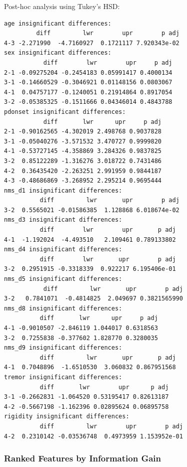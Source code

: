 \documentclass[letterpaper,12pt]{article}
\begin{document}
Post-hoc analysis using Tukey's HSD:
\begin{verbatim}
age insignificant differences:
         diff         lwr        upr        p adj
4-3 -2.271990  -4.7160927  0.1721117 7.920343e-02
sex insignificant differences:
           diff        lwr        upr     p adj
2-1 -0.09275204 -0.2454183 0.05991417 0.4000134
3-1 -0.14660529 -0.3046921 0.01148156 0.0803067
4-1  0.04757177 -0.1240051 0.21914864 0.8917054
3-2 -0.05385325 -0.1511666 0.04346014 0.4843788
pdonset insignificant differences:
           diff       lwr      upr     p adj
2-1 -0.90162565 -4.302019 2.498768 0.9037828
3-1 -0.05040276 -3.571532 3.470727 0.9999820
4-1 -0.53727145 -4.358869 3.284326 0.9837825
3-2  0.85122289 -1.316276 3.018722 0.7431486
4-2  0.36435420 -2.263251 2.991959 0.9844187
4-3 -0.48686869 -3.268952 2.295214 0.9695444
nms_d1 insignificant differences:
          diff         lwr       upr        p adj
3-2  0.5565021 -0.01586385  1.128868 6.018674e-02
nms_d3 insignificant differences:
          diff        lwr        upr       p adj
4-1  -1.192024  -4.493510   2.109461 0.789133802
nms_d4 insignificant differences:
          diff        lwr       upr        p adj
3-2  0.2951915 -0.3318339  0.922217 6.195406e-01
nms_d5 insignificant differences:
           diff         lwr       upr        p adj
3-2   0.7841071  -0.4814825  2.049697 0.3821565990
nms_d8 insignificant differences:
          diff       lwr      upr     p adj
4-1 -0.9010507 -2.846119 1.044017 0.6318563
3-2  0.7255838 -0.377602 1.828770 0.3280035
nms_d9 insignificant differences:
          diff         lwr       upr       p adj
4-1  0.7048896  -1.6510530  3.060832 0.867951568
tremor insignificant differences:
          diff       lwr        upr      p adj
3-1 -0.2662831 -1.064520 0.53195417 0.82613187
4-2 -0.5667198 -1.162396 0.02895624 0.06895758
rigidity insignificant differences:
          diff         lwr        upr        p adj
4-2  0.2310142 -0.03536748  0.4973959 1.153952e-01
\end{verbatim}

\subsubsection{Ranked Features by Information Gain}
\end{document}
